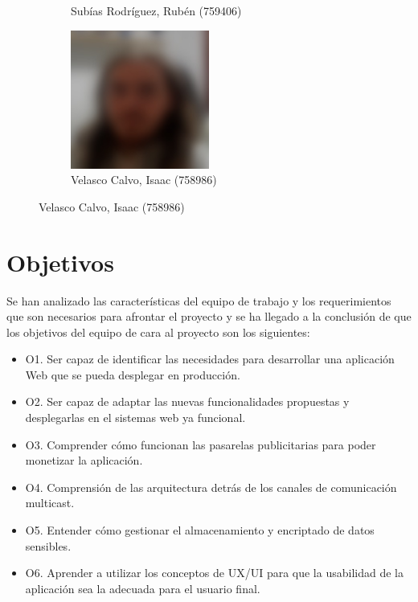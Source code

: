 \documentclass{article}
\begin{document}
\begin{figure}[H]
\begin{subfigure}[b]{0.49\textwidth}
        \caption*{Subías Rodríguez, Rubén (759406)}
     \end{subfigure}
     \hfill
     \begin{subfigure}[b]{0.49\textwidth}
        \centering
        \includegraphics[width=0.5\textwidth]{../images/Isaac.jpeg}
        \caption*{Velasco Calvo, Isaac (758986)}
     \end{subfigure}
 
    \end{figure}
 
\pagebreak
 
\section*{Objetivos}
 
Se han analizado las características del equipo de trabajo y los requerimientos que son necesarios para afrontar el proyecto y se ha llegado a la conclusión de que los objetivos del equipo de cara al proyecto son los siguientes:
 
\begin{itemize}
    \item O1. Ser capaz de identificar las necesidades para desarrollar una aplicación Web que se pueda desplegar en producción.
    \item O2. Ser capaz de adaptar las nuevas funcionalidades propuestas y desplegarlas en el sistemas web ya funcional.
    \item O3. Comprender cómo funcionan las pasarelas publicitarias para poder monetizar la aplicación.
    \item O4. Comprensión de las arquitectura detrás de los  canales de comunicación multicast.
    \item O5. Entender cómo gestionar el almacenamiento y encriptado de datos sensibles.
    \item O6. Aprender a utilizar los conceptos de UX/UI para que la usabilidad de la aplicación sea la adecuada para el usuario final.
\end{itemize}
 
\end{document}
